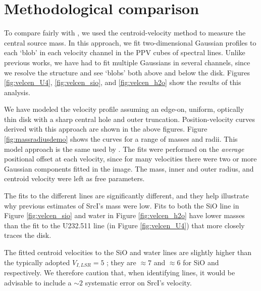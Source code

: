 \documentclass[twocolumn]{aastex61}
\newcommand{\sourcei}{SrcI}
\begin{document}
\section{Methodological comparison}
\label{appendix:centroids}
To compare fairly with \citet{Plambeck2016a}, we  used the centroid-velocity
method to measure the central source mass.  In this approach, we fit
two-dimensional Gaussian
profiles to each `blob' in each velocity channel in the PPV cubes of spectral
lines.  Unlike previous works, we have had to fit multiple Gaussians in several
channels, since we resolve the structure and see `blobs' both above and below
the disk.
Figures \ref{fig:velcen_U4}, \ref{fig:velcen_sio}, and \ref{fig:velcen_h2o}
show the results of this analysis.



We have modeled the velocity profile assuming an edge-on, uniform, optically
thin disk with a sharp central hole and outer truncation.  
Position-velocity curves derived with this approach are shown in the above
figures. Figure \ref{fig:massradiusdemo}
shows the curves for a range of masses and radii.
This model approach is the same used by
\citet{Plambeck2016a}.
The fits were performed on the \emph{average} positional offset at each
velocity, since for many velocities there were two or more Gaussian
components fitted in the image.  The mass, inner and outer radius, and
centroid velocity were left as free parameters.

The fits to the different lines are significantly different, and they 
help illustrate why previous estimates of \sourcei's mass were low.
Fits to both the SiO line in Figure \ref{fig:velcen_sio} and water
in Figure \ref{fig:velcen_h2o} have lower masses than the fit to the U232.511
line (in Figure \ref{fig:velcen_U4}) that more closely traces the disk.

The fitted centroid velocities to the SiO and water lines are slightly higher
than the typically adopted $V_{I,LSR}=5$ \kms; they are  $\approx7$ and
$\approx6$ \kms for SiO and \water respectively.  We therefore caution that,
when identifying lines, it would be advisable to include a $\sim2$ \kms
systematic error on \sourcei's velocity.
\end{document}
